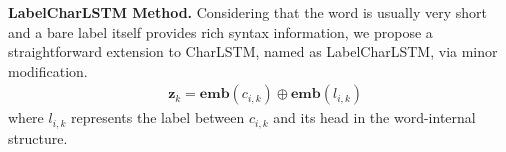 \textbf{LabelCharLSTM Method.} 
Considering that the word is usually very short and a bare label itself provides rich syntax information,  
we propose a straightforward extension to CharLSTM, named as LabelCharLSTM, via minor modification.%
\begin{equation}\label{eq:labelcharlstm-eq}
\begin{split}
& \mathbf{z}_{k} = \mathbf{emb}(c_{i,k}) \oplus \mathbf{emb}(l_{i,k})
\end{split}
\end{equation}
where $l_{i,k}$ represents the label between $c_{i,k}$ and its head in the word-internal structure. 
